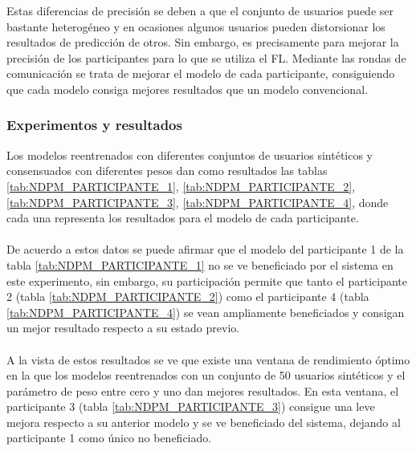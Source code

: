 Estas diferencias de precisión se deben a que el conjunto de usuarios puede ser bastante heterogéneo y en ocasiones algunos usuarios pueden distorsionar los resultados de predicción de otros. Sin embargo, es precisamente para mejorar la precisión de los participantes para lo que se utiliza el FL. Mediante las rondas de comunicación se trata de mejorar el modelo de cada participante, consiguiendo que cada modelo consiga mejores resultados que un modelo convencional.

\subsubsection{Experimentos y resultados}
Los modelos reentrenados con diferentes conjuntos de usuarios sintéticos y consensuados con diferentes pesos dan como resultados las tablas \ref{tab:NDPM_PARTICIPANTE_1}, \ref{tab:NDPM_PARTICIPANTE_2}, \ref{tab:NDPM_PARTICIPANTE_3}, \ref{tab:NDPM_PARTICIPANTE_4}, donde cada una representa los resultados para el modelo de cada participante.
\\ \\
De acuerdo a estos datos se puede afirmar que el modelo del participante 1 de la tabla \ref{tab:NDPM_PARTICIPANTE_1} no se ve beneficiado por el sistema en este experimento, sin embargo, su participación permite que tanto el participante 2 (tabla \ref{tab:NDPM_PARTICIPANTE_2}) como el participante 4 (tabla \ref{tab:NDPM_PARTICIPANTE_4}) se vean ampliamente beneficiados y consigan un mejor resultado respecto a su estado previo.
\\ \\
A la vista de estos resultados se ve que existe una ventana de rendimiento óptimo en la que los modelos reentrenados con un conjunto de 50 usuarios sintéticos y el parámetro de peso entre cero y uno dan mejores resultados. En esta ventana, el participante 3 (tabla \ref{tab:NDPM_PARTICIPANTE_3}) consigue una leve mejora respecto a su anterior modelo y se ve beneficiado del sistema, dejando al participante 1 como único no beneficiado. 
